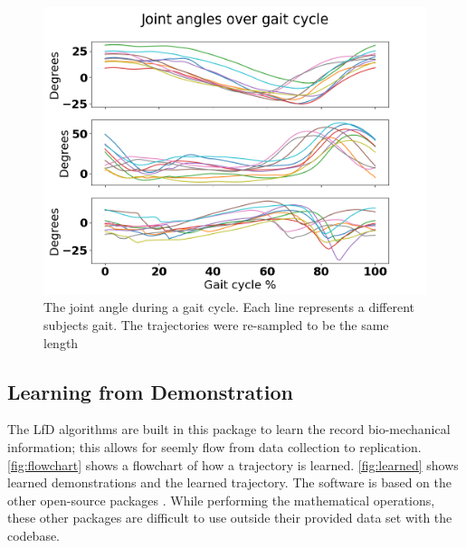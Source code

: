 \begin{figure}[h]
  \centering
    \includegraphics[scale=0.5]{images/software/gaitcycle.png}
    \caption[Gait Cycles]{The joint angle during a gait cycle. Each line represents a different subjects gait. The trajectories were re-sampled to be the same length}
    \label{fig:gaitDetection}
\end{figure}



\subsection{Learning from Demonstration}

The LfD algorithms are built in this package to learn the record bio-mechanical information; this allows for seemly flow from data collection to replication. \autoref{fig:flowchart} shows a flowchart of how a trajectory is learned. \autoref{fig:learned} shows learned demonstrations and the learned trajectory. The software is based on the other open-source packages \cite{calinon2016tutorial}. While performing the mathematical operations, these other packages are difficult to use outside their provided data set with the codebase. 


